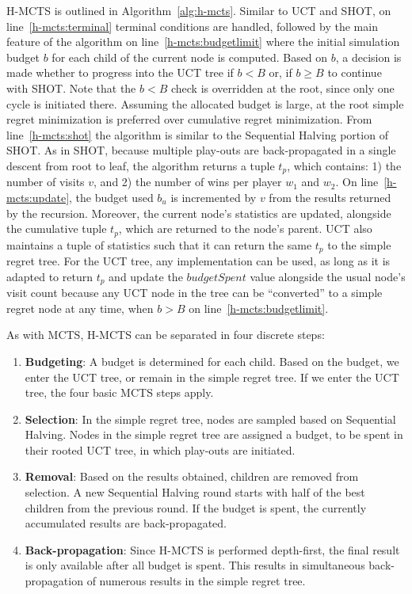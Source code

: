 \documentclass{kecsmstr}
\begin{document}
H-MCTS is outlined in Algorithm~\ref{alg:h-mcts}. Similar to UCT and SHOT, on line~\ref{h-mcts:terminal} terminal conditions are handled, followed by the main feature of the algorithm on line~\ref{h-mcts:budgetlimit} where the initial simulation budget $b$ for each child of the current node is computed. Based on $b$, a decision is made whether to progress into the UCT tree if $b<B$ or, if $b \geq B$ to continue with SHOT. Note that the $b<B$ check is overridden at the root, since only one cycle is initiated there. Assuming the allocated budget is large, at the root simple regret minimization is preferred over cumulative regret minimization. From line~\ref{h-mcts:shot} the algorithm is similar to the Sequential Halving portion of SHOT. As in SHOT, because multiple play-outs are back-propagated in a single descent from root to leaf, the algorithm returns a tuple $t_p$, which contains: 1) the number of visits $v$, and 2) the number of wins per player $w_1$ and $w_2$. On line~\ref{h-mcts:update}, the budget used $b_u$ is incremented by $v$ from the results returned by the recursion. Moreover, the current node's statistics are updated, alongside the cumulative tuple $t_p$, which are returned to the node's parent. UCT also maintains a tuple of statistics such that it can return the same $t_p$ to the simple regret tree. For the UCT tree, any implementation can be used, as long as it is adapted to return $t_p$ and update the $budgetSpent$ value alongside the usual node's visit count because any UCT node in the tree can be ``converted'' to a simple regret node at any time, when $b>B$ on line~\ref{h-mcts:budgetlimit}. 

As with MCTS, H-MCTS can be separated in four discrete steps:
\begin{enumerate}
\item \textbf{Budgeting}: A budget is determined for each child. Based on the budget, we enter the UCT tree, or remain in the simple regret tree. If we enter the UCT tree, the four basic MCTS steps apply.
\item \textbf{Selection}: In the simple regret tree, nodes are sampled based on Sequential Halving. Nodes in the simple regret tree are assigned a budget, to be spent in their rooted UCT tree, in which play-outs are initiated.
\item \textbf{Removal}: Based on the results obtained, children are removed from selection. A new Sequential Halving round starts with half of the best children from the previous round. If the budget is spent, the currently accumulated results are back-propagated.
\item \textbf{Back-propagation}: Since H-MCTS is performed depth-first, the final result is only available after all budget is spent. This results in simultaneous back-propagation of numerous results in the simple regret tree.
\end{enumerate}
\end{document}

